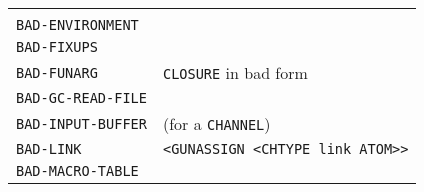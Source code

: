 \documentclass[a4paper]{scrbook}
\begin{document}
\begin{longtable}[]{@{}ll@{}}
\begin{minipage}[t]{0.36\columnwidth}
\end{minipage}\tabularnewline
\begin{minipage}[t]{0.58\columnwidth}\raggedright\strut
\texttt{BAD-ENVIRONMENT}\strut
\end{minipage} & \begin{minipage}[t]{0.36\columnwidth}\raggedright\strut
\strut
\end{minipage}\tabularnewline
\begin{minipage}[t]{0.58\columnwidth}\raggedright\strut
\texttt{BAD-FIXUPS}\strut
\end{minipage} & \begin{minipage}[t]{0.36\columnwidth}\raggedright\strut
\strut
\end{minipage}\tabularnewline
\begin{minipage}[t]{0.58\columnwidth}\raggedright\strut
\texttt{BAD-FUNARG}\strut
\end{minipage} & \begin{minipage}[t]{0.36\columnwidth}\raggedright\strut
\texttt{CLOSURE} in bad form\strut
\end{minipage}\tabularnewline
\begin{minipage}[t]{0.58\columnwidth}\raggedright\strut
\texttt{BAD-GC-READ-FILE}\strut
\end{minipage} & \begin{minipage}[t]{0.36\columnwidth}\raggedright\strut
\strut
\end{minipage}\tabularnewline
\begin{minipage}[t]{0.58\columnwidth}\raggedright\strut
\texttt{BAD-INPUT-BUFFER}\strut
\end{minipage} & \begin{minipage}[t]{0.36\columnwidth}\raggedright\strut
(for a \texttt{CHANNEL})\strut
\end{minipage}\tabularnewline
\begin{minipage}[t]{0.58\columnwidth}\raggedright\strut
\texttt{BAD-LINK}\strut
\end{minipage} & \begin{minipage}[t]{0.36\columnwidth}\raggedright\strut
\texttt{\textless{}GUNASSIGN\ \textless{}CHTYPE\ link\ ATOM\textgreater{}\textgreater{}}\strut
\end{minipage}\tabularnewline
\begin{minipage}[t]{0.58\columnwidth}\raggedright\strut
\texttt{BAD-MACRO-TABLE}\strut
\end{minipage} & \begin{minipage}[t]{0.36\columnwidth}\raggedright\strut

\end{minipage}
\end{longtable}
\end{document}
